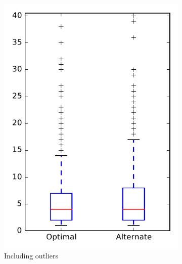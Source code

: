 
\begin{figure}
    \centering
    \begin{subfigure}{.4\textwidth}
        \centering
        \includegraphics[height=0.4\textheight]{figures/combo/dit_rq1_all}
        \caption{Including outliers}\label{fig:combo:dit:rq1:all_outlier}
    \end{subfigure}%
    \begin{subfigure}{.4\textwidth}
        \centering

\end{subfigure}
\end{figure}
